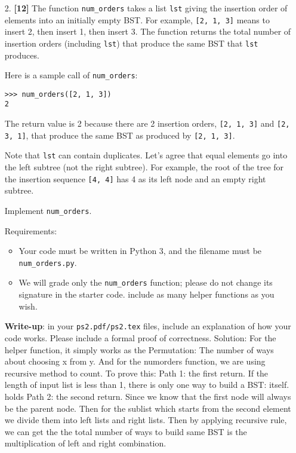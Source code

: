 \documentclass{assignment-263}
\begin{document}
\begin{enumerate}
\item[2.] \textbf{[12]} 
The function \verb|num_orders| takes a list \verb|lst| giving the insertion order of elements into an initially empty BST. For example, \verb|[2, 1, 3]| means to insert 2, then insert 1, then insert 3.
The function returns the total number of insertion orders (including \verb|lst|) that produce the same BST that \verb|lst| produces. 

Here is a sample call of \verb|num_orders|:
\begin{verbatim}
>>> num_orders([2, 1, 3])
2
\end{verbatim}
The return value is 2 because there are 2 insertion orders, \verb|[2, 1, 3]| and \verb|[2, 3, 1]|, that produce the same BST as produced by \verb|[2, 1, 3]|.

Note that \verb|lst| can contain duplicates. Let's agree that equal elements go into the left subtree (not the right subtree). For example, the root of the tree for the insertion sequence \verb|[4, 4]| has 4 as its left node and an empty right subtree.

Implement \verb|num_orders|.

Requirements:
\begin{itemize}
\item Your code must be written in Python 3, and the filename must be \verb|num_orders.py|.
\item We will grade only the \verb|num_orders| function; please do not change its signature in the starter code. include as many helper functions as you wish.
   \end{itemize}

\textbf{Write-up}: in your \verb|ps2.pdf/ps2.tex| files, include an explanation of how your code works. Please include a formal proof of correctness.\vskip5pt
Solution:\vskip5pt
For the helper function, it simply works as the Permutation: The number of ways about choosing x from y. And for the numorders function, we are using recursive method to count. To prove this:\vskip5pt
Path 1: the first return. If the length of input list is less than 1, there is only one way to build a BST: itself. holds\vskip5pt
Path 2: the second return. Since we know that the first node will always be the parent node. Then for the sublist which starts from the second element we divide them into left lists and right lists. Then by applying recursive rule, we can get the the total number of ways to build same BST is the multiplication of left and right combination.



\end{enumerate}
\end{document}
